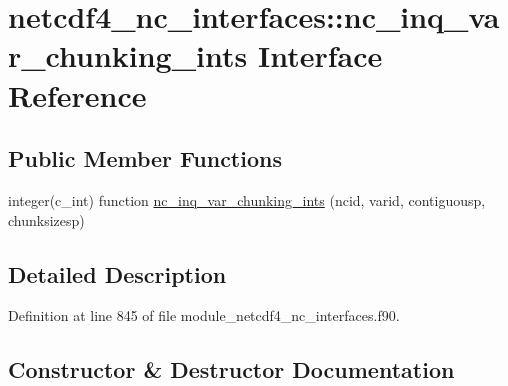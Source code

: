 \hypertarget{interfacenetcdf4__nc__interfaces_1_1nc__inq__var__chunking__ints}{}\section{netcdf4\+\_\+nc\+\_\+interfaces\+:\+:nc\+\_\+inq\+\_\+var\+\_\+chunking\+\_\+ints Interface Reference}
\label{interfacenetcdf4__nc__interfaces_1_1nc__inq__var__chunking__ints}
\subsection*{Public Member Functions}
\begin{DoxyCompactItemize}
\item 
integer(c\+\_\+int) function \hyperlink{interfacenetcdf4__nc__interfaces_1_1nc__inq__var__chunking__ints_a07315e78f66be670a16e064b7b6a00ee}{nc\+\_\+inq\+\_\+var\+\_\+chunking\+\_\+ints} (ncid, varid, contiguousp, chunksizesp)
\end{DoxyCompactItemize}


\subsection{Detailed Description}


Definition at line 845 of file module\+\_\+netcdf4\+\_\+nc\+\_\+interfaces.\+f90.



\subsection{Constructor \& Destructor Documentation}
\mbox{\label{interfacenetcdf4__nc__interfaces_1_1nc__inq__var__chunking__ints_a07315e78f66be670a16e064b7b6a00ee}} 
